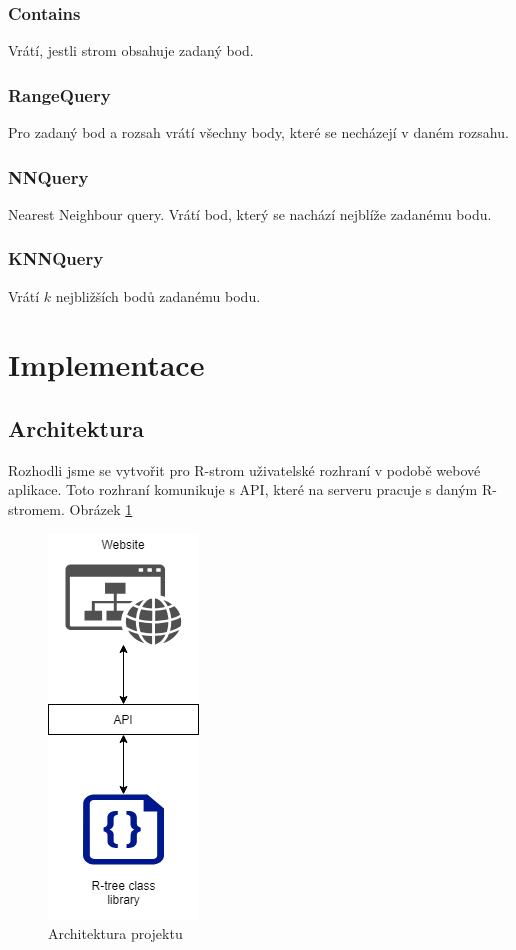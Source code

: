 \documentclass[a4paper,10pt]{article}
\begin{document}
\subsubsection*{Contains}
Vrátí, jestli strom obsahuje zadaný bod.


\subsubsection*{RangeQuery}
Pro zadaný bod a rozsah vrátí všechny body, které se necházejí v daném rozsahu.


\subsubsection*{NNQuery}
Nearest Neighbour query. Vrátí bod, který se nachází nejblíže zadanému bodu.


\subsubsection*{KNNQuery}
Vrátí $k$ nejbližších bodů zadanému bodu.


\section{Implementace}
\subsection{Architektura}
Rozhodli jsme se vytvořit pro R-strom uživatelské rozhraní v podobě webové aplikace. Toto rozhraní komunikuje s API, které na serveru pracuje s daným R-stromem. Obrázek \ref{fig:architektura}
\begin{figure}
    \centering
    \includegraphics[width=.3\textwidth]{Diagram.png}
    \caption{Architektura projektu}
    \label{fig:architektura}
\end{figure}
\end{document}
